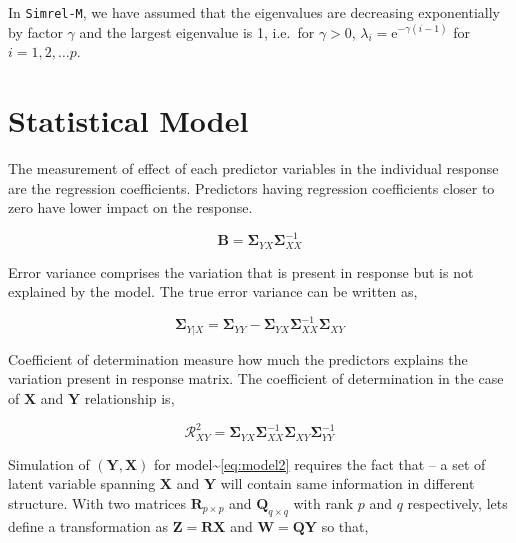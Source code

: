 \documentclass[12pt,a4paperpaper,authoryear]{elsarticle} %
\providecommand{\tightlist}{%
  \setlength{\itemsep}{0pt}\setlength{\parskip}{0pt}}
\begin{document}
In \texttt{Simrel-M}, we have assumed that the eigenvalues are
decreasing exponentially by factor \(\gamma\) and the largest eigenvalue
is 1, i.e.~for \(\gamma > 0\), \(\lambda_i = \text{e}^{-\gamma(i-1)}\)
for \(i = 1, 2, \ldots p\).

\section{Statistical Model}\label{statistical-model}

\begin{description}
\tightlist
\item[Regression Coefficients \(\left(\boldsymbol{B}\right)\)]
The measurement of effect of each predictor variables in the individual
response are the regression coefficients. Predictors having regression
coefficients closer to zero have lower impact on the response.

\begin{equation}
\mathbf{B} = \boldsymbol{\Sigma}_{YX} \boldsymbol{\Sigma}_{XX}^{-1}
  \end{equation}
\item[Error Variance \(\left(\boldsymbol{\Sigma}_{Y|X}\right)\)]
Error variance comprises the variation that is present in response but
is not explained by the model. The true error variance can be written
as,

\begin{equation}
\boldsymbol{\Sigma}_{Y|X} = \boldsymbol{\Sigma}_{YY} - 
  \boldsymbol{\Sigma}_{YX} \boldsymbol{\Sigma}_{XX}^{-1} \boldsymbol{\Sigma}_{XY}
  \end{equation}
\item[Population Coefficient of Determination
\(\left(\boldsymbol{\mathcal{R}}_{XY}\right)\)]
Coefficient of determination measure how much the predictors explains
the variation present in response matrix. The coefficient of
determination in the case of \(\mathbf{X}\) and \(\mathbf{Y}\)
relationship is,

\begin{equation}
\boldsymbol{\mathcal{R}}^2_{XY} = \boldsymbol{\Sigma}_{YX} \boldsymbol{\Sigma}_{XX}^{-1}
  \boldsymbol{\Sigma}_{XY} \boldsymbol{\Sigma}_{YY}^{-1}
  \end{equation}
\end{description}

Simulation of \((\mathbf{Y, X})\) for
model\textasciitilde{}\eqref{eq:model2} requires the fact that -- a set of
latent variable spanning \(\mathbf{X}\) and \(\mathbf{Y}\) will contain
same information in different structure. With two matrices
\(\mathbf{R}_{p\times p}\) and \(\mathbf{Q}_{q \times q}\) with rank
\(p\) and \(q\) respectively, lets define a transformation as
\(\mathbf{Z} = \mathbf{RX}\) and \(\mathbf{W} = \mathbf{QY}\) so that,
\end{document}
